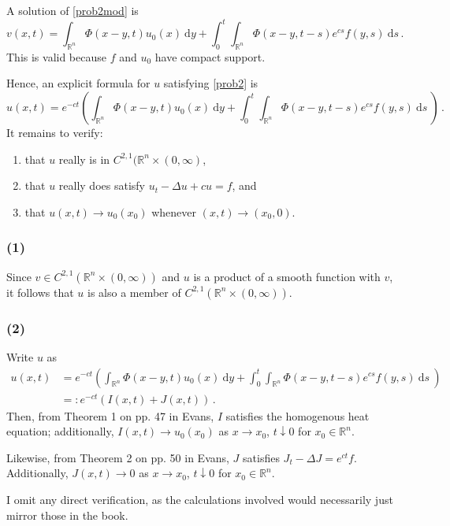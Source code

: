 \documentclass[11pt]{amsart}
\theoremstyle{definition}
\newcommand{\dy}{\mbox{d}y}
\newcommand{\ds}{\mbox{d}s}
\newcommand{\R}{\mathbb{R}}
\numberwithin{equation}{section}
\begin{document}
A solution of \eqref{prob2mod} is 
\begin{equation}
v(x,t) = \int_{\R^n}\!\!\!\!
\Phi(x - y,t) u_0(x)
\:\dy 
+ 
\int_0^t\!\! \int_{\R^n}\!\!\!\!
 \Phi(x - y, t - s)e^{cs}f(y, s) \:\ds\,.
\end{equation}
This is valid because $f$ and $u_0$ have compact support.

Hence, an explicit formula for $u$ satisfying \eqref{prob2} is
\begin{equation}
u(x,t) = e^{-ct}\left(
\int_{\R^n}\!\!\!\!
\Phi(x-  y,t) u_0(x)
\:\dy 
+ 
\int_0^t\!\! \int_{\R^n}\!\!\!\!
 \Phi(x - y, t - s)e^{cs}f(y, s) \:\ds\
\right) 
\,.
\end{equation}
It remains to verify:
\begin{enumerate}
\item that $u$ really is in $C^{2,1}(\R^n \times(0,\infty)$,
\item that $u$ really does satisfy $u_t - \Delta u + cu = f$, and
\item that $u(x,t) \to u_0(x_0)$ whenever $(x,t) \to (x_0,0)$.
\end{enumerate}

\subsubsection*{(1)}
Since $v \in C^{2,1}(\R^n \times (0,\infty))$ and $u$ is a product of a smooth function with $v$, it follows that $u$ is also a member of $C^{2,1}(\R^n \times (0,\infty))$.

\subsubsection*{(2)}
Write $u$ as 
\begin{align*}
u(x,t) &= e^{-ct}\left(
\int_{\R^n}\!\!\!\!
\Phi(x-  y,t) u_0(x)
\:\dy 
+ 
\int_0^t\!\! \int_{\R^n}\!\!\!\!
 \Phi(x - y, t - s)e^{cs}f(y, s) \:\ds\
\right) \\
&=: e^{-ct}(I(x,t) + J(x,t))\,.
\end{align*}
Then, from Theorem 1 on pp. 47 in Evans, $I$ satisfies the homogenous heat equation; additionally, $I(x,t) \to u_0(x_0)$ as $x \to x_0$, $t \downarrow 0$ for $x_0 \in \R^n$.

Likewise, from Theorem 2 on pp. 50 in Evans, $J$ satisfies $J_t - \Delta J = e^{ct}f$. Additionally, $J(x,t) \to 0$ as $x \to x_0$, $t \downarrow 0$ for $x_0 \in \R^n$.

I omit any direct verification, as the calculations involved would necessarily just mirror those in the book.
\end{document}

